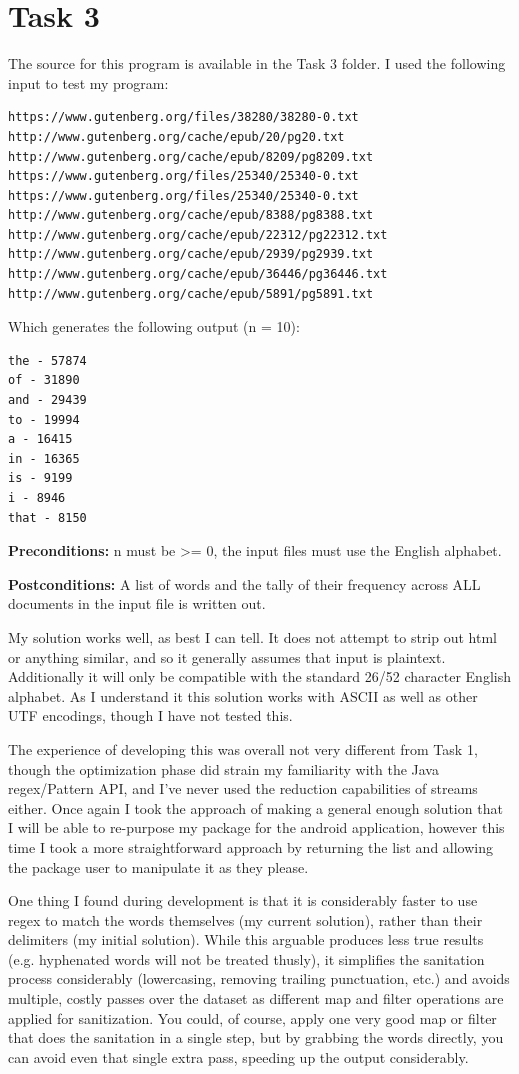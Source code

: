 \documentclass[11pt]{article}
\begin{document}
	\section{Task 3}
	The source for this program is available in the Task 3 folder. I used the following input to test my program:
\begin{verbatim}
https://www.gutenberg.org/files/38280/38280-0.txt
http://www.gutenberg.org/cache/epub/20/pg20.txt
http://www.gutenberg.org/cache/epub/8209/pg8209.txt
https://www.gutenberg.org/files/25340/25340-0.txt
https://www.gutenberg.org/files/25340/25340-0.txt
http://www.gutenberg.org/cache/epub/8388/pg8388.txt
http://www.gutenberg.org/cache/epub/22312/pg22312.txt
http://www.gutenberg.org/cache/epub/2939/pg2939.txt
http://www.gutenberg.org/cache/epub/36446/pg36446.txt
http://www.gutenberg.org/cache/epub/5891/pg5891.txt
\end{verbatim}
Which generates the following output (n = 10):
\begin{verbatim}
the - 57874
of - 31890
and - 29439
to - 19994
a - 16415
in - 16365
is - 9199
i - 8946
that - 8150
\end{verbatim}

\textbf{Preconditions:} n must be >= 0, the input files must use the English alphabet.

\textbf{Postconditions:} A list of words and the tally of their frequency across ALL documents in the input file is written out.

My solution works well, as best I can tell. It does not attempt to strip out html or anything similar, and so it generally assumes that input is plaintext. Additionally it will only be compatible with the standard 26/52 character English alphabet. As I understand it this solution works with ASCII as well as other UTF encodings, though I have not tested this.

The experience of developing this was overall not very different from Task 1, though the optimization phase did strain my familiarity with the Java regex/Pattern API, and I've never used the reduction capabilities of streams either. Once again I took the approach of making a general enough solution that I will be able to re-purpose my package for the android application, however this time I took a more straightforward approach by returning the list and allowing the package user to manipulate it as they please.

One thing I found during development is that it is considerably faster to use regex to match the words themselves (my current solution), rather than their delimiters (my initial solution). While this arguable produces less true results (e.g. hyphenated words will not be treated thusly), it simplifies the sanitation process considerably (lowercasing, removing trailing punctuation, etc.) and avoids multiple, costly passes over the dataset as different map and filter operations are applied for sanitization. You could, of course, apply one very good map or filter that does the sanitation in a single step, but by grabbing the words directly, you can avoid even that single extra pass, speeding up the output considerably.
\end{document}
